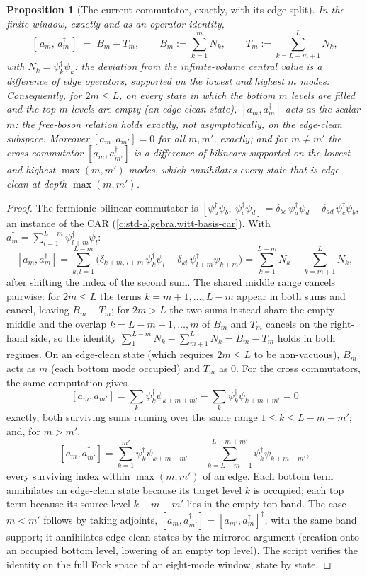 \documentclass[11pt]{article}
\newtheorem{proposition}[theorem]{Proposition}
\theoremstyle{definition}
\theoremstyle{plain}
\begin{document}
\begin{proposition}[The current commutator, exactly, with its edge split]\label{c:hawking.current-commutator-exactly-edge-split}
In the finite window, exactly and as an operator identity,
\[
[\,a_m,\, a_m^\dagger\,] \;=\; B_m - T_m, \qquad
B_m := \sum_{k=1}^{m} N_k, \qquad T_m := \sum_{k=L-m+1}^{L} N_k ,
\]
with $N_k = \psi_k^\dagger\psi_k$: the deviation from the infinite-volume central value is a difference of \emph{edge operators}, supported on the lowest and highest $m$ modes. Consequently, for $2m \le L$, on every state in which the bottom $m$ levels are filled and the top $m$ levels are empty (an \emph{edge-clean} state), $[a_m, a_m^\dagger]$ acts as the scalar $m$: the free-boson relation holds exactly, not asymptotically, on the edge-clean subspace. Moreover $[a_m, a_{m'}] = 0$ for all $m, m'$, exactly; and for $m \neq m'$ the cross commutator $[a_m, a_{m'}^\dagger]$ is a difference of bilinears supported on the lowest and highest $\max(m, m')$ modes, which annihilates every state that is edge-clean at depth $\max(m, m')$.
\end{proposition}
\begin{proof}
The fermionic bilinear commutator is $[\psi_a^\dagger\psi_b,\ \psi_c^\dagger\psi_d] = \delta_{bc}\,\psi_a^\dagger\psi_d - \delta_{ad}\,\psi_c^\dagger\psi_b$, an instance of the CAR (\ref{c:std-algebra.witt-basis-car}). With $a_m^\dagger = \sum_{l=1}^{L-m}\psi_{l+m}^\dagger\psi_l$:
\[
[a_m, a_m^\dagger] = \sum_{k,l=1}^{L-m}\bigl(\delta_{k+m,\,l+m}\,\psi_k^\dagger\psi_l - \delta_{k l}\,\psi_{l+m}^\dagger\psi_{k+m}\bigr)
= \sum_{k=1}^{L-m} N_k - \sum_{k=m+1}^{L} N_k ,
\]
after shifting the index of the second sum. The shared middle range cancels pairwise: for $2m \le L$ the terms $k = m{+}1, \dots, L{-}m$ appear in both sums and cancel, leaving $B_m - T_m$; for $2m > L$ the two sums instead share the empty middle and the overlap $k = L{-}m{+}1, \dots, m$ of $B_m$ and $T_m$ cancels on the right-hand side, so the identity $\sum_{1}^{L-m} N_k - \sum_{m+1}^{L} N_k = B_m - T_m$ holds in both regimes. On an edge-clean state (which requires $2m \le L$ to be non-vacuous), $B_m$ acts as $m$ (each bottom mode occupied) and $T_m$ as $0$. For the cross commutators, the same computation gives
\[
[a_m, a_{m'}] = \sum_{k}\psi_k^\dagger\psi_{k+m+m'} - \sum_{k}\psi_k^\dagger\psi_{k+m+m'} = 0
\]
exactly, both surviving sums running over the same range $1 \le k \le L - m - m'$; and, for $m > m'$,
\[
[a_m, a_{m'}^\dagger] = \sum_{k=1}^{m'}\psi_k^\dagger\psi_{k+m-m'} \;-\; \sum_{k=L-m+1}^{L-m+m'}\psi_k^\dagger\psi_{k+m-m'},
\]
every surviving index within $\max(m,m')$ of an edge. Each bottom term annihilates an edge-clean state because its target level $k$ is occupied; each top term because its source level $k + m - m'$ lies in the empty top band. The case $m < m'$ follows by taking adjoints, $[a_m, a_{m'}^\dagger] = [a_{m'}, a_m^\dagger]^\dagger$, with the same band support; it annihilates edge-clean states by the mirrored argument (creation onto an occupied bottom level, lowering of an empty top level). The script verifies the identity on the full Fock space of an eight-mode window, state by state.

\end{proof}
\end{document}
